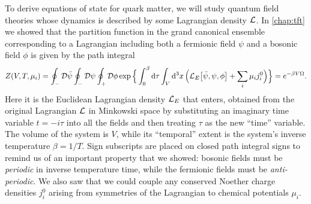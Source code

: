 To derive equations of state for quark matter, we will study quantum field theories whose dynamics is described by some Lagrangian density $\mathcal{L}$.
In \cref{chap:tft} we showed that the partition function in the grand canonical ensemble corresponding to a Lagrangian including both a fermionic field $\psi$ and a bosonic field $\phi$ is given by the path integral
\begin{equation}
	Z(V, T, \mu_i) = \oint_- \mathcal{D} \bar{\psi} \oint_- \mathcal{D} \psi \oint_+ \mathcal{D} \phi \exp \Big\{ \int_0^\beta \mathop{}\!\mathrm{d} \tau \int_V \mathop{}\!\mathrm{d}^3 x \, \Big( \mathcal{L}_E\big[\bar{\psi}, \psi, \phi\big] + \sum_i \mu_i j^0_i \Big) \Big\} = e^{-\beta V \Omega} .
\label{eq:master_intro:partition_function}
\end{equation}
Here it is the Euclidean Lagrangian density $\mathcal{L}_E$ that enters,
obtained from the original Lagrangian $\mathcal{L}$ in Minkowski space by substituting an imaginary time variable $t = -i \tau$ into all the fields and then treating $\tau$ as the new ``time'' variable.
The volume of the system is $V$, while its ``temporal'' extent is the system's inverse temperature $\beta = 1/T$.
Sign subscripts are placed on closed path integral signs to remind us of an important property that we showed: bosonic fields must be \emph{periodic} in inverse temperature time, while the fermionic fields must be \emph{anti-periodic}.
We also saw that we could couple any conserved Noether charge densities $j^0_i$ arising from symmetries of the Lagrangian to chemical potentials $\mu_i$.

